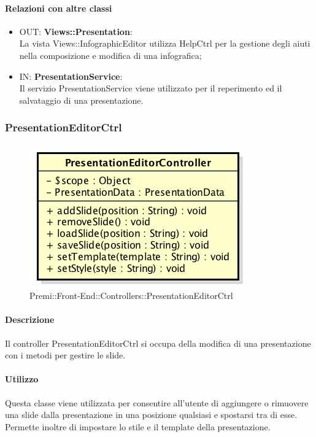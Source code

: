 	\paragraph{Relazioni con altre classi}
	\begin{itemize}
	  \item OUT: \textbf{Views::Presentation}:\\
		La vista Views::InfographicEditor utilizza HelpCtrl per la gestione degli aiuti nella composizione e modifica di una infografica;	
	  \item IN: \textbf{PresentationService}: \\
	  	Il servizio PresentationService viene utilizzato per il reperimento ed il salvataggio di una presentazione.
	\end{itemize}
	
\newpage	
\subsubsection{PresentationEditorCtrl}
\begin{figure}[h]
	\centering
	\includegraphics[width=0.5\linewidth]{img/premi_front_end_controllers_presentationeditorcontroller}
	\caption[Premi::Front-End::Controllers::PresentationEditorCtrl]{Premi::Front-End::Controllers::PresentationEditorCtrl}
\end{figure}

	\paragraph{Descrizione}
	Il controller PresentationEditorCtrl si occupa della modifica di una presentazione con i metodi per gestire le slide.
	
	\paragraph{Utilizzo}
	Questa classe viene utilizzata per consentire all'utente di aggiungere o rimuovere una slide dalla presentazione in una posizione qualsiasi e spostarsi tra di esse. Permette inoltre di impostare lo stile e il template della presentazione.
	
